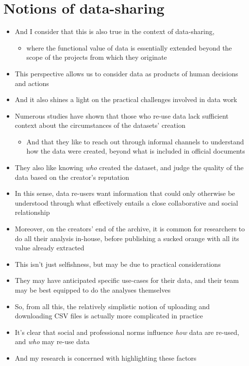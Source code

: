 \documentclass{article}
\begin{document}
\section{Notions of data-sharing}
\begin{itemize}
  \item And I consider that this is also true in the context of data-sharing,
  \begin{itemize}
    \item where the functional value of data is essentially extended beyond the scope of the projects from which they originate 
  \end{itemize}
  \item This perspective allows us to consider data as products of human decisions and actions
  \item And it also shines a light on the practical challenges involved in data work
  \item Numerous studies have shown that those who re-use data lack sufficient context about the circumstances of the datasets' creation
  \begin{itemize}
    \item And that they like to reach out through informal channels to understand how the data were created, beyond what is included in official documents
  \end{itemize}
  \item They also like knowing \emph{who} created the dataset, and judge the quality of the data based on the creator's reputation
  \item In this sense, data re-users want information that could only otherwise be understood through what effectively entails a close collaborative and social relationship
  \item Moreover, on the creators' end of the archive, it is common for researchers to do all their analysis in-house, before publishing a sucked orange with all its value already extracted
  \item This isn't just selfishness, but may be due to practical considerations
  \item They may have anticipated specific use-cases for their data, and their team may be best equipped to do the analyses themselves
  \item So, from all this, the relatively simplistic notion of uploading and downloading CSV files is actually more complicated in practice
  \item It's clear that social and professional norms influence \emph{how} data are re-used, and \emph{who} may re-use data
  \item And my research is concerned with highlighting these factors
\end{itemize}
\end{document}
